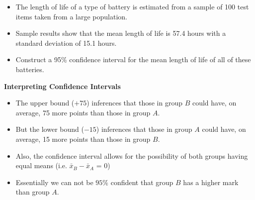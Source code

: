 \documentclass[]{report}
\begin{document}
\begin{itemize}
\item The length of life of a type of battery is estimated from a sample of 100 test items taken from a large population. 
\item Sample results show that the mean length of life is 57.4 hours with a standard deviation of 15.1 hours. \\ \bigskip
\item  Construct a 
95\% confidence interval for the mean length of life of all of these batteries.
\end{itemize}



\textbf{Interpreting Confidence Intervals}
\begin{itemize}
\item The upper bound ($+75$) inferences that those in group $B$ could have, on average, 75 more points than those in group $A$.
\item But the lower bound ($-15$) inferences that those in group $A$ could have, on average, 15 more points than those in group $B$.
\item Also, the confidence interval allows for the possibility of both groups having equal means  (i.e. $\bar{x}_B-\bar{x}_A$ = 0)
\item Essentially we can not be $95\%$ confident that group $B$ has a higher mark than group $A$.
\end{itemize}


\end{document}
